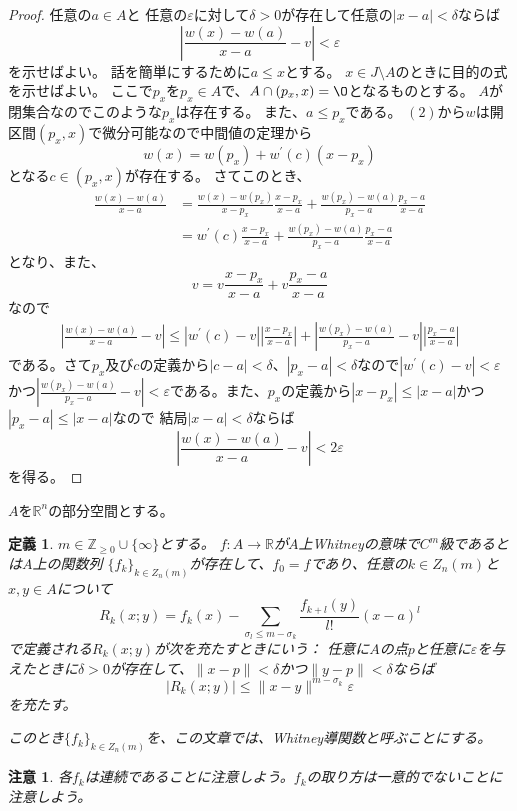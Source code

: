 \documentclass[leqno]{jsarticle}
\newtheorem{df}[thm]{定義}
\newtheorem*{cau}{注意}
\newcommand{\zz}{\mathbb{Z}}
\newcommand{\rr}{\mathbb{R}}
\newcommand{\ep}{\varepsilon}
\begin{document}
\begin{proof}
任意の$a\in A$と
任意の$\ep$に対して$\delta>0$が存在して任意の$|x-a|<\delta$ならば
\[
\left|\frac{w(x)-w(a)}{x-a}-v\right|<\ep
\]
を示せばよい。
話を簡単にするために$a\le x$とする。
$x\in J\setminus A$のときに目的の式を示せばよい。
ここで$p_x$を$p_x\in A$で、$A\cap (p_x, x)=\O$となるものとする。
$A$が閉集合なのでこのような$p_x$は存在する。
また、$a\le p_x$である。
$(2)$から$w$は開区間$(p_x, x)$で微分可能なので中間値の定理から
\[
w(x)=w(p_x)+w^{\prime}(c)(x-p_x)
\]
となる$c\in (p_x, x)$が存在する。
さてこのとき、
\begin{align*}
\frac{w(x)-w(a)}{x-a}
&=
\frac{w(x)-w(p_x)}{x-p_x}\frac{x-p_x}{x-a}+\frac{w(p_x)-w(a)}{p_x-a}\frac{p_x-a}{x-a}\\
&=
w^{\prime}(c)\frac{x-p_x}{x-a}+\frac{w(p_x)-w(a)}{p_x-a}\frac{p_x-a}{x-a}
\end{align*}
となり、また、
\[
v=v\frac{x-p_x}{x-a}+v\frac{p_x-a}{x-a}
\]
なので
\begin{align*}
\left|\frac{w(x)-w(a)}{x-a}-v \right|
\le
|w^{\prime}(c)-v|\left|\frac{x-p_x}{x-a}\right| +\left|\frac{w(p_x)-w(a)}{p_x-a}-v\right|\left|\frac{p_x-a}{x-a}\right|
\end{align*}
である。さて$p_x$及び$c$の定義から$|c-a|<\delta$、$|p_x-a|<\delta$なので$|w^{\prime}(c)-v|<\ep$かつ$\left|\frac{w(p_x)-w(a)}{p_x-a}-v\right|<\ep$である。また、$p_x$の定義から$|x-p_x|\le |x-a|$かつ$|p_x-a|\le |x-a|$なので
結局$|x-a|<\delta$ならば
\[
\left|\frac{w(x)-w(a)}{x-a}-v \right|<2\ep
\]
を得る。
\end{proof}
$A$を$\rr^n$の部分空間とする。
\begin{df}
$m\in \zz_{\ge 0}\cup\{\infty\}$とする。
$f:A\to \rr$が$A$上Whitneyの意味で$C^m$級であるとは$A$上の関数列
$\{f_k\}_{k\in Z_n(m)}$が存在して、$f_0=f$であり、任意の$k\in Z_n(m)$と
$x,y\in A$について
\[
R_k(x;y)=f_k(x)-\sum_{\sigma_l\le m-\sigma_k}\frac{f_{k+l}(y)}{l!}(x-a)^l
\]
で定義される$R_k(x;y)$が次を充たすときにいう：
任意に$A$の点$p$と任意に$\ep$を与えたときに$\delta>0$が存在して、$\|x-p\|<\delta$かつ$\|y-p\|<\delta$ならば
\[
|R_k(x;y)|\le \|x-y\|^{m-\sigma_k}\ep
\]
を充たす。

このとき$\{f_k\}_{k\in Z_n(m)}$を、この文章では、Whitney導関数と呼ぶことにする。
\end{df}
\begin{cau}
各$f_k$は連続であることに注意しよう。$f_k$の取り方は一意的でないことに注意しよう。
\end{cau}
\end{document}
